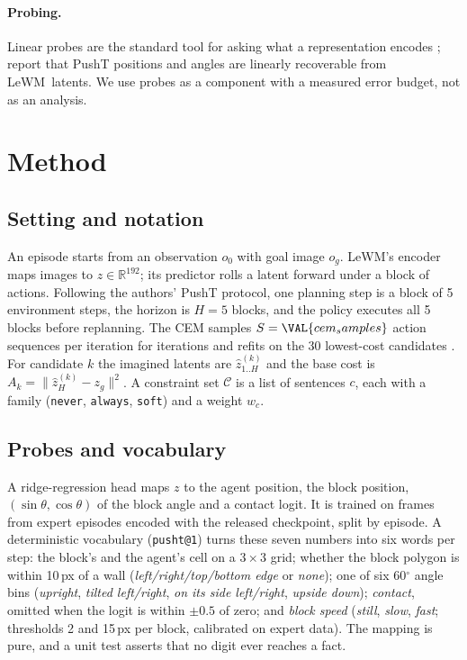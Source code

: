 \documentclass[11pt]{article}
\newcommand{\lewm}{LeWM}
\begin{document}
\paragraph{Probing.} Linear probes are the standard tool for asking what a representation encodes \citep{alain2017probes}; \citet{maes2026lewm} report that PushT positions and angles are linearly recoverable from \lewm\ latents. We use probes as a component with a measured error budget, not as an analysis.

\section{Method}
\subsection{Setting and notation}
An episode starts from an observation $o_0$ with goal image $o_g$. \lewm's encoder maps images to $z\in\mathbb{R}^{192}$; its predictor rolls a latent forward under a block of actions. Following the authors' PushT protocol, one planning step is a block of 5 environment steps, the horizon is $H=5$ blocks, and the policy executes all 5 blocks before replanning. The CEM samples $S=\VAL{cem_samples}$ action sequences per iteration for  iterations and refits on the 30 lowest-cost candidates \citep{deboer2005cem}. For candidate $k$ the imagined latents are $\hat z^{(k)}_{1..H}$ and the base cost is $A_k=\lVert \hat z^{(k)}_H - z_g\rVert^2$. A constraint set $\mathcal{C}$ is a list of sentences $c$, each with a family (\texttt{never}, \texttt{always}, \texttt{soft}) and a weight $w_c$.

\subsection{Probes and vocabulary}\label{sec:method-probes}
A ridge-regression head maps $z$ to the agent position, the block position, $(\sin\theta,\cos\theta)$ of the block angle and a contact logit. It is trained on  frames from  expert episodes encoded with the released checkpoint, split by episode. A deterministic vocabulary (\texttt{pusht@1}) turns these seven numbers into six words per step: the block's and the agent's cell on a $3\times3$ grid; whether the block polygon is within 10\,px of a wall (\emph{left/right/top/bottom edge} or \emph{none}); one of six 60$^\circ$ angle bins (\emph{upright}, \emph{tilted left/right}, \emph{on its side left/right}, \emph{upside down}); \emph{contact}, omitted when the logit is within $\pm0.5$ of zero; and \emph{block speed} (\emph{still}, \emph{slow}, \emph{fast}; thresholds 2 and 15\,px per block, calibrated on expert data). The mapping is pure, and a unit test asserts that no digit ever reaches a fact.
\end{document}
